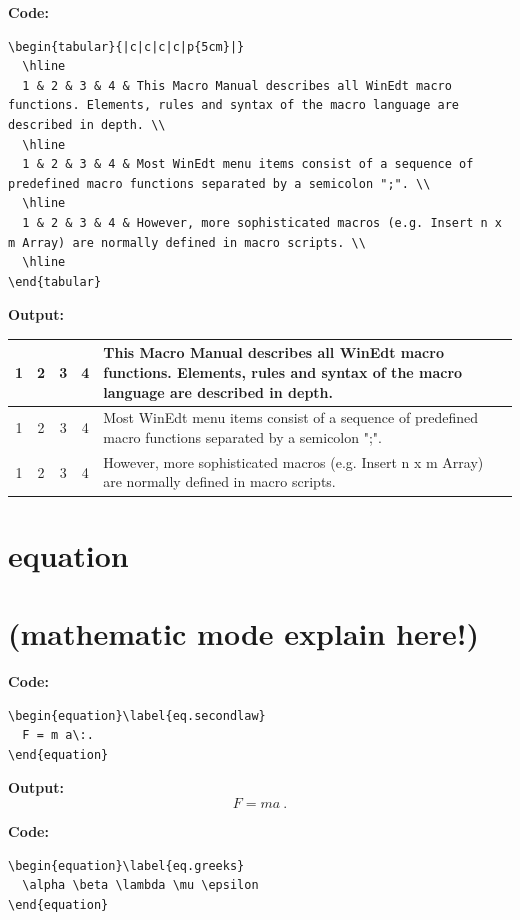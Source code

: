 \documentclass{book}
\newcommand{\myc}{\noindent\textbf{{\color{blue} Code}:}}
\newcommand{\myo}{\noindent\textbf{{\color{blue} Output}:\\}}
\begin{document}
\myc
\begin{lstlisting}
\begin{tabular}{|c|c|c|c|p{5cm}|}
  \hline
  1 & 2 & 3 & 4 & This Macro Manual describes all WinEdt macro functions. Elements, rules and syntax of the macro language are described in depth. \\
  \hline
  1 & 2 & 3 & 4 & Most WinEdt menu items consist of a sequence of predefined macro functions separated by a semicolon ";". \\
  \hline
  1 & 2 & 3 & 4 & However, more sophisticated macros (e.g. Insert n x m Array) are normally defined in macro scripts. \\
  \hline
\end{tabular}
\end{lstlisting}
\myo
\begin{tabular}{|c|c|c|c|p{5cm}|}
  \hline
  1 & 2 & 3 & 4 & This Macro Manual describes all WinEdt macro functions. Elements, rules and syntax of the macro language are described in depth. \\
  \hline
  1 & 2 & 3 & 4 & Most WinEdt menu items consist of a sequence of predefined macro functions separated by a semicolon ";". \\
  \hline
  1 & 2 & 3 & 4 & However, more sophisticated macros (e.g. Insert n x m Array) are normally defined in macro scripts. \\
  \hline
\end{tabular}


\section{equation}
\section*{(mathematic mode explain here!)}
\myc
\begin{lstlisting}
\begin{equation}\label{eq.secondlaw}
  F = m a\:.
\end{equation}
\end{lstlisting}


\myo
\begin{equation}\label{eq.secondlaw}
  F = m a\:.
\end{equation}

\myc
\begin{lstlisting}
\begin{equation}\label{eq.greeks}
  \alpha \beta \lambda \mu \epsilon
\end{equation}
\end{lstlisting}
\end{document}
